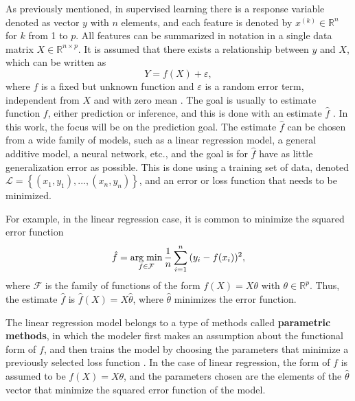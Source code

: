 As previously mentioned, in supervised learning there is a response variable denoted as vector $y$ with $n$ elements, and each feature is denoted by $x^{(k)} \in \mathbb{R}^n$ for $k$ from 1 to $p$. All features can be summarized in notation in a single data matrix $X \in \mathbb{R}^{n \times p}$. It is assumed that there exists a relationship between $y$ and $X$, which can be written as
\begin{equation}
  \label{eq:general_learning_model}
  Y = f(X) + \varepsilon,
\end{equation}
where $f$ is a fixed but unknown function and $\varepsilon$ is a random error term, independent from $X$ and with zero mean \cite[p.~16]{james2013introduction}. The goal is usually to estimate function $f$, either prediction or inference, and this is done with an estimate $\hat{f}$ \cite[p.~17]{james2013introduction}.
In this work, the focus will be on the prediction goal.
The estimate $\hat{f}$ can be chosen from a wide family of models, such as a linear regression model, a general additive model, a neural network, etc., and the goal is for $\hat{f}$ have as little generalization error as possible. This is done using a training set of data, denoted $\mathcal{L} = \left\{ (x_1, y_1), ..., (x_n, y_n) \right\}$, and an error or loss function that needs to be minimized.

For example, in the linear regression case, it is common to minimize the squared error function
\begin{equation}
  \hat{f} = \operatorname*{arg\; min}_{f \in \mathcal{F}} \frac{1}{n} \sum_{i = 1}^n{ ( y_i - f(x_i) ) ^ 2},
\end{equation}
where $\mathcal{F}$ is the family of functions of the form $f(X) = X\theta$ with $\theta \in \mathbb{R}^p$. Thus, the  estimate $\hat{f}$ is $\hat{f}(X) = X \hat{\theta}$, where $\hat{\theta}$ minimizes the error function.

The linear regression model belongs to a type of methods called \textbf{parametric methods}, in which the modeler first makes an assumption about the functional form of $f$, and then trains the model by choosing the parameters that minimize a previously selected loss function \cite[p.~21]{james2013introduction}. In the case of linear regression, the form of $f$ is assumed to be $f(X) = X\theta$, and the parameters chosen are the elements of the $\hat{\theta}$ vector that minimize the squared error function of the model.

